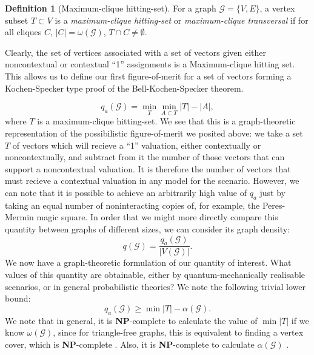 \documentclass{amsart}
\theoremstyle{definition}
\newtheorem{defn}{Definition}
\begin{document}
\begin{defn}[Maximum-clique hitting-set]
For a graph $\mathcal{G}=\{V,E\}$, a vertex subset $T\subset V$ is a \emph{maximum-clique hitting-set} or \emph{maximum-clique transversal} if for all cliques $C$, $|C|=\omega(\mathcal{G})$, $T\cap C\neq\emptyset$.
\end{defn}

Clearly, the set of vertices associated with a set of vectors given either noncontextual or contextual ``1'' assignments is a Maximum-clique hitting set. This allows us to define our first figure-of-merit for a set of vectors forming a Kochen-Specker type proof of the Bell-Kochen-Specker theorem.

\begin{equation}q_a(\mathcal{G})=\min_T \min_{A\subset T} |T|-|A|,\end{equation}
where $T$ is a maximum-clique hitting-set. We see that this is a graph-theoretic representation of the possibilistic figure-of-merit we posited above: we take a set $T$ of vectors which will recieve a ``1'' valuation, either contextually or noncontextually, and subtract from it the number of those vectors that can support a noncontextual valuation. It is therefore the number of vectors that must recieve a contextual valuation in any model for the scenario. However, we can note that it is possible to achieve an arbitrarily high value of $q_a$ just by taking an equal number of noninteracting copies of, for example, the Peres-Mermin magic square. In order that we might more directly compare this quantity between graphs of different sizes, we can consider its graph density:
\begin{equation}
q(\mathcal{G})=\frac{q_a(\mathcal{G})}{|V(\mathcal{G})|}.
\end{equation}
We now have a graph-theoretic formulation of our quantity of interest. What values of this quantity are obtainable, either by quantum-mechanically realisable scenarios, or in general probabilistic theories? We note the following trivial lower bound:
\begin{equation}
q_a(\mathcal{G})\geq \min |T|-\alpha(\mathcal{G}).
\end{equation}
We note that in general, it is \textbf{NP}-complete to calculate the value of $\min |T|$ if we know $\omega(\mathcal{G})$, since for triangle-free graphs, this is equivalent to finding a vertex cover, which is \textbf{NP}-complete \cite{Polj1974}. Also, it is \textbf{NP}-complete to calculate $\alpha(\mathcal{G})$ \cite{Gare1979}. 
\end{document}

